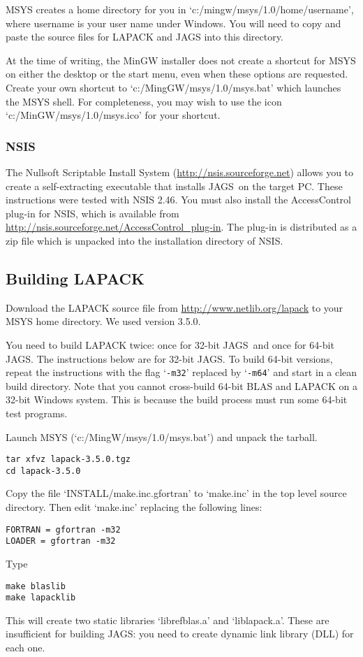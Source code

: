 \documentclass[11pt, a4paper, titlepage]{article}
\newcommand{\JAGS}{\textsf{JAGS}}
\newcommand{\code}[1]{{\bgroup{\normalfont\ttfamily #1}\egroup}}
\newcommand{\samp}[1]{{`\bgroup\normalfont\texttt{#1}'\egroup}}
\newcommand{\file}[1]{{`\normalfont\textsf{#1}'}}
\let\option=\samp
\begin{document}
MSYS creates a home directory for you in
\file{c:/mingw/msys/1.0/home/username}, where \code{username} is your
user name under Windows. You will need to copy and paste the source
files for LAPACK and JAGS into this directory.

At the time of writing, the MinGW installer does not create a shortcut
for MSYS on either the desktop or the start menu, even when these
options are requested. Create your own shortcut to
\file{c:/MingGW/msys/1.0/msys.bat} which launches the MSYS shell. For
completeness, you may wish to use the icon
\file{c:/MinGW/msys/1.0/msys.ico} for your shortcut.

\subsubsection{NSIS}

The Nullsoft Scriptable Install System
(\url{http://nsis.sourceforge.net}) allows you to create a
self-extracting executable that installs \JAGS\ on the target PC.
These instructions were tested with NSIS 2.46.  You must also install
the AccessControl plug-in for NSIS, which is available from
\url{http://nsis.sourceforge.net/AccessControl_plug-in}. The plug-in
is distributed as a zip file which is unpacked into the installation
directory of NSIS.

\subsection{Building LAPACK}

Download the LAPACK source file from
\url{http://www.netlib.org/lapack} to your MSYS home directory. We
used version 3.5.0.

You need to build LAPACK twice: once for 32-bit \JAGS\ and once for
64-bit \JAGS. The instructions below are for 32-bit \JAGS. To build
64-bit versions, repeat the instructions with the flag \option{-m32}
replaced by \option{-m64} and start in a clean build directory.  Note
that you cannot cross-build 64-bit BLAS and LAPACK on a 32-bit Windows
system. This is because the build process must run some 64-bit test
programs.

Launch MSYS (\file{c:/MingW/msys/1.0/msys.bat}) and unpack the tarball.
\begin{verbatim}
tar xfvz lapack-3.5.0.tgz
cd lapack-3.5.0
\end{verbatim}
Copy the file \file{INSTALL/make.inc.gfortran} to \file{make.inc} in
the top level source directory.  Then edit \file{make.inc} replacing
the following lines:
\begin{verbatim}
FORTRAN = gfortran -m32
LOADER = gfortran -m32
\end{verbatim}
Type
\begin{verbatim}
make blaslib
make lapacklib 
\end{verbatim}
This will create two static libraries \file{librefblas.a} and
\file{liblapack.a}. These are insufficient for building \JAGS: you
need to create dynamic link library (DLL) for each one.
\end{document}
